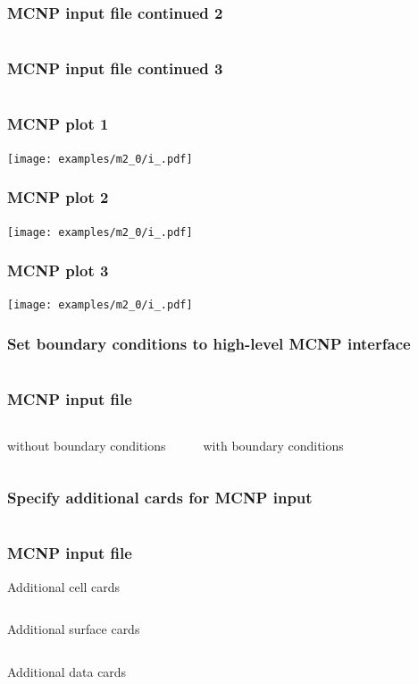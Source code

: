 \begin{frame}[fragile]
    \frametitle{MCNP input file continued 2}
    \inputminted[frame=single,fontfamily=tt,fontsize=\tiny,firstline=60,lastline=90]{rst}{examples/m2_0/i_}
\end{frame}

\begin{frame}[fragile]
    \frametitle{MCNP input file continued 3}
    \inputminted[frame=single,fontfamily=tt,fontsize=\tiny,firstline=106]{rst}{examples/m2_0/i_}
\end{frame}

\begin{frame}\frametitle{MCNP plot 1}
    \texttt{[image: examples/m2\_0/i\_.pdf]}
\end{frame}

\begin{frame}\frametitle{MCNP plot 2}
    \texttt{[image: examples/m2\_0/i\_.pdf]}
\end{frame}

\begin{frame}\frametitle{MCNP plot 3}
    \texttt{[image: examples/m2\_0/i\_.pdf]}
\end{frame}

\begin{frame}[fragile]
    \frametitle{Set boundary conditions to high-level MCNP interface}
    \inputminted[frame=single,fontfamily=tt,fontsize=\footnotesize]{python}{examples/hmcnp3.py}
\end{frame}

\begin{frame}[fragile]
    \frametitle{MCNP input file}
    \begin{columns}
        {\tiny without boundary conditions}
        \inputminted[frame=single,fontfamily=tt,fontsize=\tiny,firstline=28,lastline=43]{rst}{examples/m2_0/i_}
        {\tiny with boundary conditions}
        \inputminted[frame=single,fontfamily=tt,fontsize=\tiny,firstline=28,lastline=48]{rst}{examples/m3_0/i_}
    \end{columns}
\end{frame}

\begin{frame}[fragile]
    \frametitle{Specify additional cards for MCNP input}
    \inputminted[frame=single,fontfamily=tt,fontsize=\tiny]{python}{examples/hmcnp4.py}
\end{frame}

\begin{frame}[fragile]
    \frametitle{MCNP input file}
    {\tiny Additional cell cards}
    \inputminted[frame=single,fontfamily=tt,fontsize=\tiny,firstline=29,lastline=32]{rst}{examples/m4_0/i_}

    {\tiny Additional surface cards}
    \inputminted[frame=single,fontfamily=tt,fontsize=\tiny,firstline=49,lastline=55]{rst}{examples/m4_0/i_}

    {\tiny Additional data cards}
    \inputminted[frame=single,fontfamily=tt,fontsize=\tiny,firstline=129]{rst}{examples/m4_0/i_}
\end{frame}

